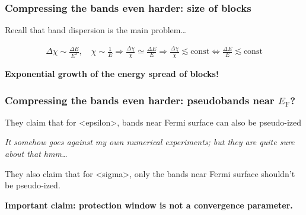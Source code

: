 \documentclass[t]{beamer}
\newcommand{\shortcode}[1]{\texttt{#1}}
\newcommand*{\const}{\text{const}}
\def\\{}%
\def\texttt#1{<#1>}%
\begin{document}
\begin{frame}
\frametitle{Compressing the bands even harder: size of blocks}

Recall that band dispersion is the main problem\dots

\[
    \begin{aligned}
        \Delta \chi \sim \frac{\Delta E}{E^2}, \quad \chi \sim \frac{1}{E} \Rightarrow
        \frac{\Delta \chi}{\chi} \simeq \frac{\Delta E}{E} \\
        \Rightarrow
        \frac{\Delta \chi}{\chi} \lesssim \const \Leftrightarrow \boxed{\frac{\Delta E}{E} \lesssim \const}
    \end{aligned}
\]

\textbf{Exponential growth of the energy spread of blocks!}

\end{frame}

\begin{frame}
\frametitle{Compressing the bands even harder: pseudobands near $E_{\text{F}}$?}

They claim that for \shortcode{epsilon}, 
bands near Fermi surface can also be pseudo-ized 

\emph{It somehow goes against my own numerical experiments; but they are quite sure about that hmm\dots}

They also claim that for \shortcode{sigma}, only the bands near Fermi surface shouldn't be pseudo-ized.

\textbf{Important claim: protection window is not a convergence parameter.} 

\end{frame}
\end{document}
